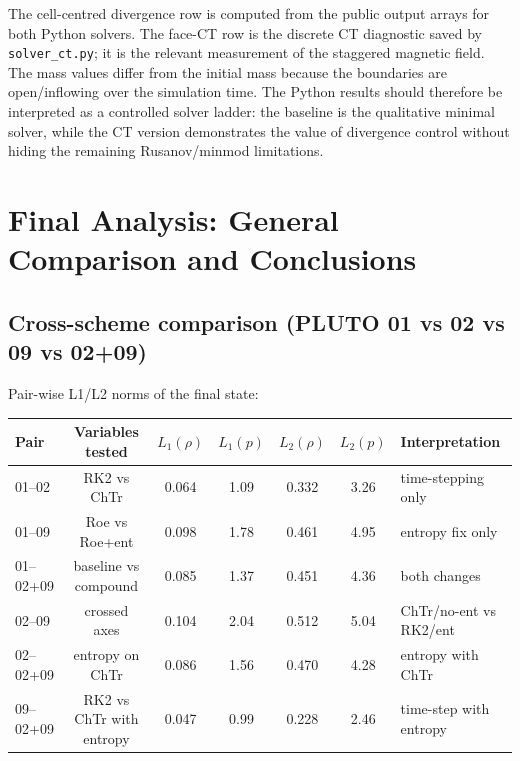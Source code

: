 \documentclass[11pt,a4paper]{article}
\begin{document}
The cell-centred divergence row is computed from the public output arrays for both Python solvers. The face-CT row is the discrete CT diagnostic saved by \texttt{solver\_ct.py}; it is the relevant measurement of the staggered magnetic field. The mass values differ from the initial mass because the boundaries are open/inflowing over the simulation time. The Python results should therefore be interpreted as a controlled solver ladder: the baseline is the qualitative minimal solver, while the CT version demonstrates the value of divergence control without hiding the remaining Rusanov/minmod limitations.

\section{Final Analysis: General Comparison and Conclusions}
\label{sec:final}

\subsection{Cross-scheme comparison (PLUTO 01 vs 02 vs 09 vs 02+09)}

Pair-wise L1/L2 norms of the final state:

\medskip
\begin{center}
\small
\begin{tabular}{lcccccl}
\toprule Pair & Variables tested & $L_1(\rho)$ & $L_1(p)$ & $L_2(\rho)$ & $L_2(p)$ & Interpretation \\ \midrule
01--02 & RK2 vs ChTr  & 0.064 & 1.09 & 0.332 & 3.26 & time-stepping only \\
01--09 & Roe vs Roe+ent & 0.098 & 1.78 & 0.461 & 4.95 & entropy fix only \\
01--02+09 & baseline vs compound & 0.085 & 1.37 & 0.451 & 4.36 & both changes \\
02--09 & crossed axes & 0.104 & 2.04 & 0.512 & 5.04 & ChTr/no-ent vs RK2/ent \\
02--02+09 & entropy on ChTr & 0.086 & 1.56 & 0.470 & 4.28 & entropy with ChTr \\
09--02+09 & RK2 vs ChTr with entropy & 0.047 & 0.99 & 0.228 & 2.46 & time-step with entropy \\ \bottomrule
\end{tabular}
\end{center}
\medskip
\end{document}
